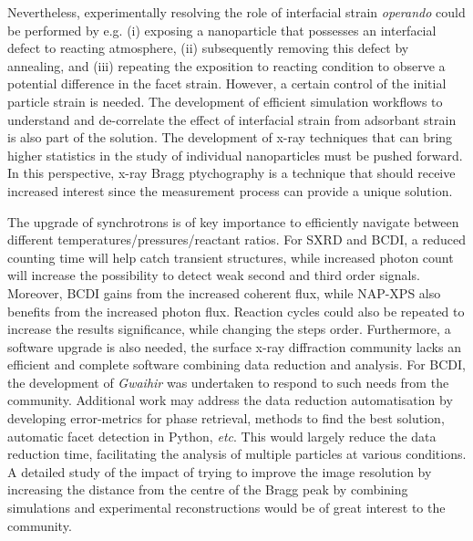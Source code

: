 Nevertheless, experimentally resolving the role of interfacial strain \textit{operando} could be performed by e.g. (i) exposing a nanoparticle that possesses an interfacial defect to reacting atmosphere, (ii) subsequently removing this defect by annealing, and (iii) repeating the exposition to reacting condition to observe a potential difference in the facet strain.
However, a certain control of the initial particle strain is needed.
The development of efficient simulation workflows to understand and de-correlate the effect of interfacial strain from adsorbant strain is also part of the solution.
The development of x-ray techniques that can bring higher statistics in the study of individual nanoparticles must be pushed forward.
In this perspective, x-ray Bragg ptychography is a technique that should receive increased interest since the measurement process can provide a unique solution.

The upgrade of synchrotrons is of key importance to efficiently navigate between different temperatures/pressures/reactant ratios.
For SXRD and BCDI, a reduced counting time will help catch transient structures, while increased photon count will increase the possibility to detect weak second and third order signals.
Moreover, BCDI gains from the increased coherent flux, while NAP-XPS also benefits from the increased photon flux.
Reaction cycles could also be repeated to increase the results significance, while changing the steps order.
Furthermore, a software upgrade is also needed, the surface x-ray diffraction community lacks an efficient and complete software combining data reduction and analysis.
For BCDI, the development of \textit{Gwaihir} was undertaken to respond to such needs from the community.
Additional work may address the data reduction automatisation by developing error-metrics for phase retrieval, methods to find the best solution, automatic facet detection in Python, \textit{etc}.
This would largely reduce the data reduction time, facilitating the analysis of multiple particles at various conditions.
A detailed study of the impact of trying to improve the image resolution by increasing the distance from the centre of the Bragg peak by combining simulations and experimental reconstructions would be of great interest to the community.